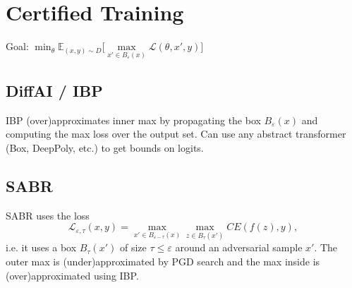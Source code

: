 \section{Certified Training}
Goal: $\min_\theta\mathbb{E}_{(x,y) \sim D} \big[ \max\limits_{{x' \in B_\varepsilon(x)}} \mathcal{L}(\theta, {x'}, y) \big]$\\
\subsection*{DiffAI / IBP}
IBP (over)approximates inner max by propagating the box $B_\varepsilon(x)$ and computing the max loss over the output set. Can use any abstract transformer (Box, DeepPoly, etc.) to get bounds on logits.

\subsection*{SABR}
SABR uses the loss\\ $$\mathcal{L}_{\varepsilon,\tau}(x,y)=\max_{x'\in B_{\varepsilon-\tau}(x)} \max_{z\in B_\tau(x')}CE(f(z),y),$$
i.e. it uses a box $B_\tau(x')$ of size $\tau \leq\varepsilon$ around an adversarial sample $x'$. The outer max is (under)approximated by PGD search and the max inside is (over)approximated using IBP.



